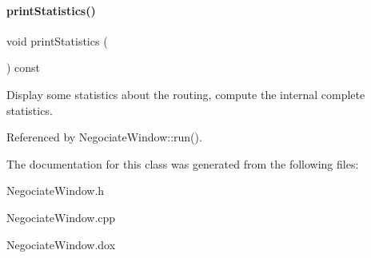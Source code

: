 \paragraph{\texorpdfstring{print\+Statistics()}{printStatistics()}}
{\footnotesize\ttfamily void print\+Statistics (\begin{DoxyParamCaption}{ }\end{DoxyParamCaption}) const}

Display some statistics about the routing, compute the internal complete statistics. 

Referenced by Negociate\+Window\+::run().



The documentation for this class was generated from the following files\+:\begin{DoxyCompactItemize}
\item 
Negociate\+Window.\+h\item 
Negociate\+Window.\+cpp\item 
Negociate\+Window.\+dox\end{DoxyCompactItemize}
